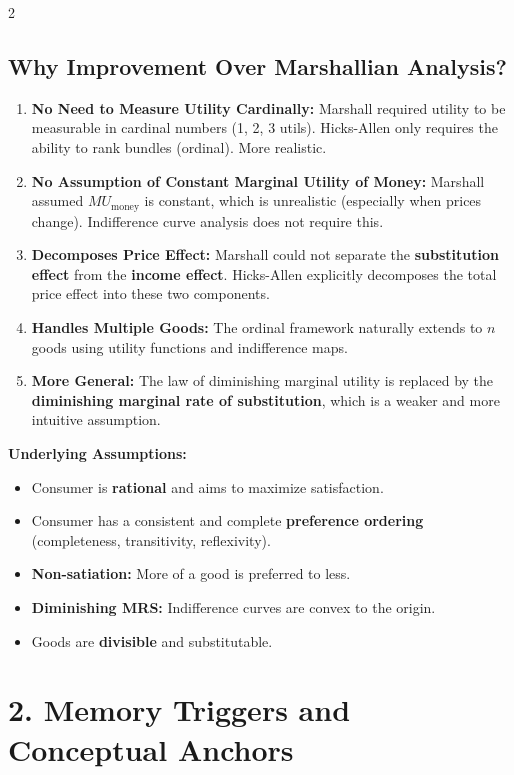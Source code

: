 \documentclass[10pt,a4paper]{article}
\begin{document}
\begin{multicols}{2}
\subsection*{Why Improvement Over Marshallian Analysis?}
\begin{enumerate}[leftmargin=*,nosep]
    \item \textbf{No Need to Measure Utility Cardinally:} Marshall required utility to be measurable in cardinal numbers (1, 2, 3 utils). Hicks-Allen only requires the ability to rank bundles (ordinal). More realistic.
    \item \textbf{No Assumption of Constant Marginal Utility of Money:} Marshall assumed $MU_{\text{money}}$ is constant, which is unrealistic (especially when prices change). Indifference curve analysis does not require this.
    \item \textbf{Decomposes Price Effect:} Marshall could not separate the \textbf{substitution effect} from the \textbf{income effect}. Hicks-Allen explicitly decomposes the total price effect into these two components.
    \item \textbf{Handles Multiple Goods:} The ordinal framework naturally extends to $n$ goods using utility functions and indifference maps.
    \item \textbf{More General:} The law of diminishing marginal utility is replaced by the \textbf{diminishing marginal rate of substitution}, which is a weaker and more intuitive assumption.
\end{enumerate}

\textbf{Underlying Assumptions:}
\begin{itemize}[leftmargin=*,nosep]
    \item Consumer is \textbf{rational} and aims to maximize satisfaction.
    \item Consumer has a consistent and complete \textbf{preference ordering} (completeness, transitivity, reflexivity).
    \item \textbf{Non-satiation:} More of a good is preferred to less.
    \item \textbf{Diminishing MRS:} Indifference curves are convex to the origin.
    \item Goods are \textbf{divisible} and substitutable.
\end{itemize}

\section*{2. Memory Triggers and Conceptual Anchors}


\end{multicols}
\end{document}
